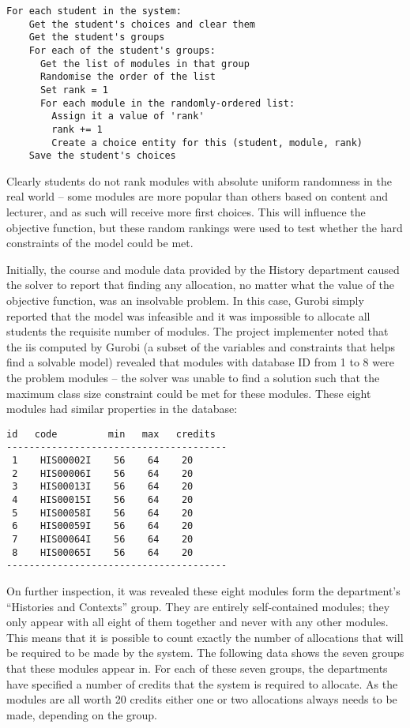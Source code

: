 \begin{Verbatim}[samepage=true]
  For each student in the system:
    Get the student's choices and clear them
    Get the student's groups
    For each of the student's groups:
      Get the list of modules in that group
      Randomise the order of the list
      Set rank = 1
      For each module in the randomly-ordered list:
        Assign it a value of 'rank'
        rank += 1
        Create a choice entity for this (student, module, rank)
    Save the student's choices
\end{Verbatim}

Clearly students do not rank modules with absolute uniform randomness in the
real world -- some modules are more popular than others based on content and
lecturer, and as such will receive more first choices. This will influence the
objective function, but these random rankings were used to test whether the
hard constraints of the model could be met.

Initially, the course and module data provided by the History department
caused the solver to report that finding any allocation, no matter what the
value of the objective function, was an insolvable problem. In this case,
Gurobi simply reported that the model was infeasible and it was impossible to
allocate all students the requisite number of modules. The project implementer
noted that the \gls{iis} computed by Gurobi (a subset of the variables and
constraints that helps find a solvable model) revealed that modules with
database ID from 1 to 8 were the problem modules -- the solver was unable to
find a solution such that the maximum class size constraint could be met for
these modules. These eight modules had similar properties in the
database:\mynobreakpar

\begin{Verbatim}[samepage=true]
 id   code         min   max   credits
---------------------------------------
 1    HIS00002I    56    64    20
 2    HIS00006I    56    64    20
 3    HIS00013I    56    64    20
 4    HIS00015I    56    64    20
 5    HIS00058I    56    64    20
 6    HIS00059I    56    64    20
 7    HIS00064I    56    64    20
 8    HIS00065I    56    64    20
---------------------------------------
\end{Verbatim}

On further inspection, it was revealed these eight modules form the
department's ``Histories and Contexts'' group. They are entirely
self-contained modules; they only appear with all eight of them together and
never with any other modules. This means that it is possible to count exactly
the number of allocations that will be required to be made by the system. The
following data shows the seven groups that these modules appear in. For each
of these seven groups, the departments have specified a number of credits that
the system is required to allocate. As the modules are all worth 20 credits
either one or two allocations always needs to be made, depending on the group.


